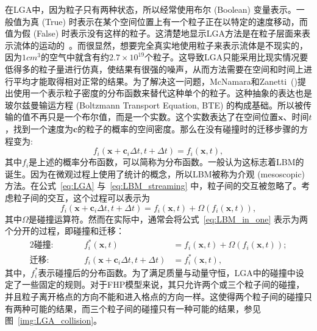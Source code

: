 在LGA中，因为粒子只有两种状态，所以经常使用布尔 (Boolean) 变量表示。一般值为真 (True) 时表示在某个空间位置上有一个粒子正在以特定的速度移动，而值为假 (False) 时表示没有这样的粒子。这清楚地显示LGA方法是在粒子层面来表示流体的运动的~\cite{wolf2004lattice}。而很显然，想要完全真实地使用粒子来表示流体是不现实的，因为$1cm^3$的空气中就含有约$2.7\times 10^{19}$个粒子。这导致LGA只能采用比现实情况要低得多的粒子量进行仿真，使结果有很强的噪声，从而方法需要在空间和时间上进行平均才能取得相对正常的结果。为了解决这一问题，McNamara和Zanetti~(\citeyear{mcnamara1988use})提出使用一个表示粒子密度的分布函数来替代这种单个的粒子。这种抽象的表达也是玻尔兹曼输运方程 (Boltzmann Transport Equation, BTE) 的构成基础。所以被传输的值不再只是一个布尔值，而是一个实数。这个实数表达了在空间位置$\mathbf{x}$、时间$t$，找到一个速度为$\mathbf{c}$的粒子的概率的空间密度。那么在没有碰撞时的迁移步骤的方程变为:
\begin{equation}
    f_{i}(\mathbf{x}+\mathbf{c}_i \Delta t,t+\Delta t)=f_{i}(\mathbf{x},t),
    \label{eq:LBM_streaming}
\end{equation}
其中$f_{i}$是上述的概率分布函数，可以简称为分布函数。一般认为这标志着LBM的诞生。因为在微观过程上使用了统计的概念，所以LBM被称为介观 (mesoscopic) 方法。在公式~\ref{eq:LGA} 与~\ref{eq:LBM_streaming} 中，粒子间的交互被忽略了。考虑粒子间的交互，这个过程可以表示为
\begin{equation}
    f_{i}(\mathbf{x}+\mathbf{c}_i \Delta t,t+\Delta t)=f_{i}(\mathbf{x},t)+\Omega(f_{i}(\mathbf{x},t)),
    \label{eq:LBM_in_one}
\end{equation}
其中$\Omega$是碰撞运算符。然而在实际中，通常会将公式~\ref{eq:LBM_in_one} 表示为两个分开的过程，即碰撞和迁移：
\begin{alignat}{2}
\textbf{碰撞:} & \quad\quad &f_i^*(\boldsymbol{x}, t) & =f_i(\boldsymbol{x}, t)+\Omega\left(f_i(\boldsymbol{x}, t)\right); \\
\textbf{迁移:} & & f_i\left(\boldsymbol{x}+\mathbf{c}_i \Delta t, t+\Delta t\right) & =f_i^*(\boldsymbol{x}, t),\label{eq:LBM_streaming_in_one}
\end{alignat}
其中，$f_i^*$表示碰撞后的分布函数。为了满足质量与动量守恒，LGA中的碰撞中设定了一些固定的规则。对于FHP模型来说，其只允许两个或三个粒子间的碰撞，并且粒子离开格点的方向不能和进入格点的方向一样。这使得两个粒子间的碰撞只有两种可能的结果，而三个粒子间的碰撞只有一种可能的结果，参见图~\ref{img:LGA_collision}。

